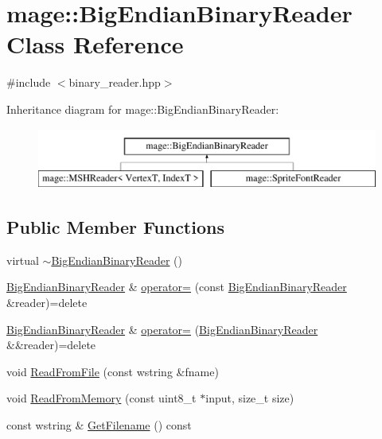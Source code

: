 \hypertarget{classmage_1_1_big_endian_binary_reader}{}\section{mage\+:\+:Big\+Endian\+Binary\+Reader Class Reference}
\label{classmage_1_1_big_endian_binary_reader}


{\ttfamily \#include $<$binary\+\_\+reader.\+hpp$>$}

Inheritance diagram for mage\+:\+:Big\+Endian\+Binary\+Reader\+:\begin{figure}[H]
\begin{center}
\leavevmode
\includegraphics[height=2.000000cm]{classmage_1_1_big_endian_binary_reader}
\end{center}
\end{figure}
\subsection*{Public Member Functions}
\begin{DoxyCompactItemize}
\item 
virtual \hyperlink{classmage_1_1_big_endian_binary_reader_ae85a40e8ed06e8c887e38d914843b8d3}{$\sim$\+Big\+Endian\+Binary\+Reader} ()
\item 
\hyperlink{classmage_1_1_big_endian_binary_reader}{Big\+Endian\+Binary\+Reader} \& \hyperlink{classmage_1_1_big_endian_binary_reader_abd4b24df4219469a8c2e9253b1cad405}{operator=} (const \hyperlink{classmage_1_1_big_endian_binary_reader}{Big\+Endian\+Binary\+Reader} \&reader)=delete
\item 
\hyperlink{classmage_1_1_big_endian_binary_reader}{Big\+Endian\+Binary\+Reader} \& \hyperlink{classmage_1_1_big_endian_binary_reader_a9e2e0dd62afff04774d0246f7e5e4ce4}{operator=} (\hyperlink{classmage_1_1_big_endian_binary_reader}{Big\+Endian\+Binary\+Reader} \&\&reader)=delete
\item 
void \hyperlink{classmage_1_1_big_endian_binary_reader_aec453e82d9b318e04894d4168db23715}{Read\+From\+File} (const wstring \&fname)
\item 
void \hyperlink{classmage_1_1_big_endian_binary_reader_ac90695d1cc20a897a0f37c7442703e7e}{Read\+From\+Memory} (const uint8\+\_\+t $\ast$input, size\+\_\+t size)
\item 
const wstring \& \hyperlink{classmage_1_1_big_endian_binary_reader_a52b2695d83679943be40dc1328f9387f}{Get\+Filename} () const
\end{DoxyCompactItemize}

